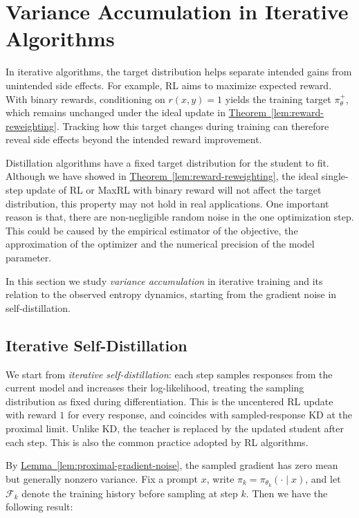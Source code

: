 \section{Variance Accumulation in Iterative Algorithms}\label{sec:variance-accumulation}

\begin{insight}
  In iterative algorithms, the target distribution helps separate intended gains from unintended side effects. For example, RL aims to maximize expected reward. With binary rewards, conditioning on $r(x,y)=1$ yields the training target $\pi_\theta^+$, which remains unchanged under the ideal update in \hyperref[lem:reward-reweighting]{Theorem~\ref*{lem:reward-reweighting}}. Tracking how this target changes during training can therefore reveal side effects beyond the intended reward improvement.
\end{insight}

Distillation algorithms have a fixed target distribution for the student to fit. Although we have showed in \hyperref[lem:reward-reweighting]{Theorem~\ref*{lem:reward-reweighting}}, the ideal single-step update of RL or MaxRL with binary reward will not affect the target distribution, this property may not hold in real applications. One important reason is that, there are non-negligible random noise in the one optimization step. This could be caused by the empirical estimator of the objective, the approximation of the optimizer and the numerical precision of the model parameter.

In this section we study \emph{variance accumulation} in iterative training and its relation to the observed entropy dynamics, starting from the gradient noise in self-distillation.

\subsection{Iterative Self-Distillation}

We start from \emph{iterative self-distillation}: each step samples responses from the current model and increases their log-likelihood, treating the sampling distribution as fixed during differentiation. This is the uncentered RL update with reward $1$ for every response, and coincides with sampled-response KD at the proximal limit. Unlike KD, the teacher is replaced by the updated student after each step. This is also the common practice adopted by RL algorithms.

By \hyperref[lem:proximal-gradient-noise]{Lemma~\ref*{lem:proximal-gradient-noise}}, the sampled gradient has zero mean but generally nonzero variance. Fix a prompt $x$, write $\pi_k=\pi_{\theta_k}(\cdot\mid x)$, and let $\mathcal F_k$ denote the training history before sampling at step $k$. Then we have the following result:

